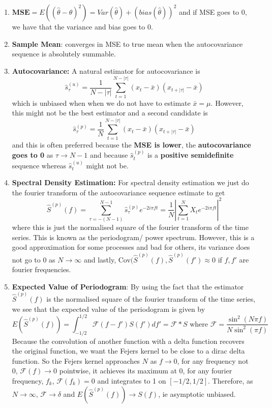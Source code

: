 \documentclass{article}
\begin{document}
\begin{enumerate} 
    \item \(\textbf{MSE} = E((\hat\theta - \theta)^2) = Var(\hat\theta) + (bias(\hat\theta))^2\) and if MSE goes to 0, we have that the variance and bias goes to 0. 
    
    \item \textbf{Sample Mean}: converges in MSE to true mean when the autocovariance sequence is absolutely summable.
    
    \item \textbf{Autocovariance:} A natural estimator for autocovariance is 
    \[
    \hat s_\tau^{(u)} = \frac{1}{N - |\tau|}\sum_{t = 1}^{N - |\tau|} (x_t- \bar x)(x_{t+|\tau|} - \bar x)
    \]
    which is unbiased when when we do not have to estimate \(\bar x = \mu.\) However, this might not be the best estimator and a second candidate is
    \[
    \hat s_\tau^{(p)} = \frac{1}{N }\sum_{t = 1}^{N - |\tau|} (x_t- \bar x)(x_{t+|\tau|} - \bar x)
    \]
    and this is often preferred because the \textbf{MSE is lower}, the \textbf{autocovariance goes to 0} as \(\tau \to N-1\) and because \(\hat s_t^{(p)}\) is a \textbf{positive semidefinite} sequence whereas \(\hat s_t^{(u)}\) might not be.
    
    \item \textbf{Spectral Density Estimation:} For spectral density estimation we just do the fourier transform of the autocovariance sequence estimate to get
    \[
    \hat S^{(p)}(f) = \sum_{\tau 
    = -(N-1)}^{N-1} \hat s_\tau^{(p)} e^{-2i\pi f t} 
    = \frac{1}{N}\left| \sum_{t=1}^N X_t  e^{-2i\pi f t} \right|^2
    \]
    where this is just the normalised square of the fourier transform of the time series. This is known as the periodogram/ power spectrum. However, this is a good approximation for some processes and bad for others, its variance does not go to 0 as \(N \to \infty\) and lastly, Cov\((\hat S^{(p)}(f), \hat S^{(p)}(f') \approx 0\) if \(f, f'\) are fourier frequencies.

    \item \textbf{Expected Value of Periodogram}: By using the fact that the estimator \(\hat S^{(p)}(f)\) is the normalised square of the fourier transform of the time series, we see that the expected value of the periodogram is given by
    \[
    E(\hat S^{(p)}(f)) = \int_{-1/2}^{1/2} \mathcal{F}(f - f')S(f')df' = \mathcal{F}*S \text{ where } \mathcal{F} = \frac{\sin^2(N \pi f)}{N \sin^2(\pi f)}
    \]
    Because the convolution of another function with a delta function recovers the original function, we want the Fejers kernel to be close to a dirac delta function. So the Fejers kernel approaches \(N\) as \(f \to 0\), for any frequency not 0, \(\mathcal{F}(f) \to 0\) pointwise, it achieves its maximum at 0, for any fourier frequency, \(f_k\), \(\mathcal{F}(f_k) = 0\) and integrates to 1 on \([-1/2, 1/2]\). Therefore, as \(N \to \infty\), \(\mathcal{F}\to \delta\) and \(E(\hat S^{(p)}(f)) \to S(f)\), ie asymptotic unbiased.


\end{enumerate}
\end{document}
